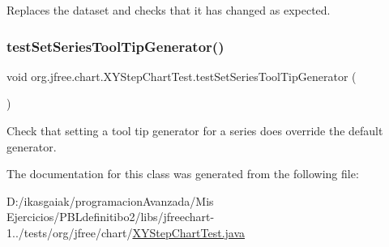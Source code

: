 Replaces the dataset and checks that it has changed as expected. \mbox{\label{classorg_1_1jfree_1_1chart_1_1_x_y_step_chart_test_ac6ebe864ff33d1c79170614fbf5cd061}} 
\subsubsection{\texorpdfstring{test\+Set\+Series\+Tool\+Tip\+Generator()}{testSetSeriesToolTipGenerator()}}
{\footnotesize\ttfamily void org.\+jfree.\+chart.\+X\+Y\+Step\+Chart\+Test.\+test\+Set\+Series\+Tool\+Tip\+Generator (\begin{DoxyParamCaption}{ }\end{DoxyParamCaption})}

Check that setting a tool tip generator for a series does override the default generator. 

The documentation for this class was generated from the following file\+:\begin{DoxyCompactItemize}
\item 
D\+:/ikasgaiak/programacion\+Avanzada/\+Mis Ejercicios/\+P\+B\+Ldefinitibo2/libs/jfreechart-\/1../tests/org/jfree/chart/\mbox{\hyperlink{_x_y_step_chart_test_8java}{X\+Y\+Step\+Chart\+Test.\+java}}\end{DoxyCompactItemize}
